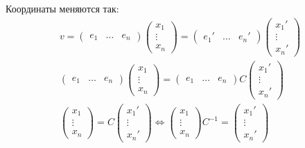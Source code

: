 Координаты меняются так:
\begin{gather*}
    v
    =
    \begin{pmatrix}
        e_1 & \ldots & e_n
    \end{pmatrix}
    \begin{pmatrix}
        x_1
        \\
        \vdots
        \\
        x_n
    \end{pmatrix}
    =
    \begin{pmatrix}
        e_1' & \ldots & e_n'
    \end{pmatrix}
    \begin{pmatrix}
        x_1'
        \\
        \vdots
        \\
        x_n'
    \end{pmatrix}
    \\
    \begin{pmatrix}
        e_1 & \ldots & e_n
    \end{pmatrix}
    \begin{pmatrix}
        x_1
        \\
        \vdots
        \\
        x_n
    \end{pmatrix}
    =
    \begin{pmatrix}
        e_1 & \ldots & e_n
    \end{pmatrix}
    C
    \begin{pmatrix}
        x_1'
        \\
        \vdots
        \\
        x_n'
    \end{pmatrix}
    \\
    \begin{pmatrix}
        x_1
        \\
        \vdots
        \\
        x_n
    \end{pmatrix}
    =
    C
    \begin{pmatrix}
        x_1'
        \\
        \vdots
        \\
        x_n'
    \end{pmatrix}
    \Leftrightarrow
    \begin{pmatrix}
        x_1
        \\
        \vdots
        \\
        x_n
    \end{pmatrix}
    C^{-1}
    =
    \begin{pmatrix}
        x_1'
        \\
        \vdots
        \\
        x_n'
    \end{pmatrix}
\end{gather*}

